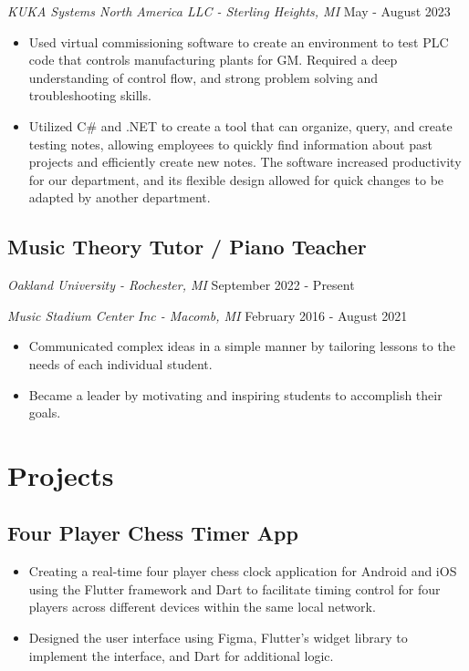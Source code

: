 \documentclass{article}
\newcommand{\resumesection}[1]{
	\section*{\Large\textbf{#1}}
	\hrulefill
	\vspace{1ex}
}
\begin{document}
\textit{KUKA Systems North America LLC - Sterling Heights, MI} \hfill {May - August 2023}

\begin{itemize}
	\item Used virtual commissioning software to create an environment to test PLC code that controls manufacturing plants for GM. Required a deep understanding of control flow, and strong problem solving and troubleshooting skills.
	\item Utilized C\# and .NET to create a tool that can organize, query, and create testing notes, allowing employees to quickly find information about past projects and efficiently create new notes. The software increased productivity for our department, and its flexible design allowed for quick changes to be adapted by another department.
\end{itemize}

\subsection*{Music Theory Tutor / Piano Teacher}

\textit{Oakland University - Rochester, MI} \hfill {September 2022 - Present}

\textit{Music Stadium Center Inc - Macomb, MI } \hfill {February 2016 - August 2021}

\begin{itemize}
	\item Communicated complex ideas in a simple manner by tailoring lessons to the needs of each individual student.
	\item Became a leader by motivating and inspiring students to accomplish their goals.
\end{itemize}


\resumesection{Projects}

\subsection*{Four Player Chess Timer App}

\begin{itemize}
	\item Creating a real-time four player chess clock application for Android and iOS using the Flutter framework and Dart to facilitate timing control for four players across different devices within the same local network. 
	\item Designed the user interface using Figma, Flutter's widget library to implement the interface, and Dart for additional logic.
\end{itemize}
\end{document}
